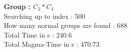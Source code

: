 \textbf{Group : $C_2*C_4$}\\
Searching up to index : 500\\
How many normal groups are found : 688\\
Total Time in s : 240.6\\
Total Magma-Time in s : 470.73\\
